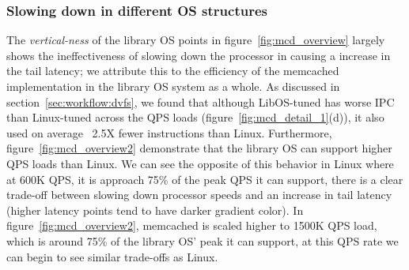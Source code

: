 \subsubsection{Slowing down in different OS structures } 
\label{sec:mcd:slowinos}
The \textit{vertical-ness} of the library OS points in figure~\ref{fig:mcd_overview} largely shows the ineffectiveness of slowing down the processor in causing a increase in the tail latency; we attribute this to the efficiency of the memcached implementation in the library OS system as a whole. As discussed in section~\ref{sec:workflow:dvfs}, we found that although LibOS-tuned has worse IPC than Linux-tuned across the QPS loads (figure~\ref{fig:mcd_detail_1}(d)), it also used on average ~2.5X fewer instructions than Linux. Furthermore, figure~\ref{fig:mcd_overview2} demonstrate that the library OS can support higher QPS loads than Linux. We can see the opposite of this behavior in Linux where at 600K QPS, it is approach 75\% of the peak QPS it can support, there is a clear trade-off between slowing down processor speeds and an increase in tail latency (higher latency points tend to have darker gradient color). In figure~\ref{fig:mcd_overview2}, memcached is scaled higher to 1500K QPS load, which is around 75\% of the library OS' peak it can support, at this QPS rate we can begin to see similar trade-offs as Linux.




